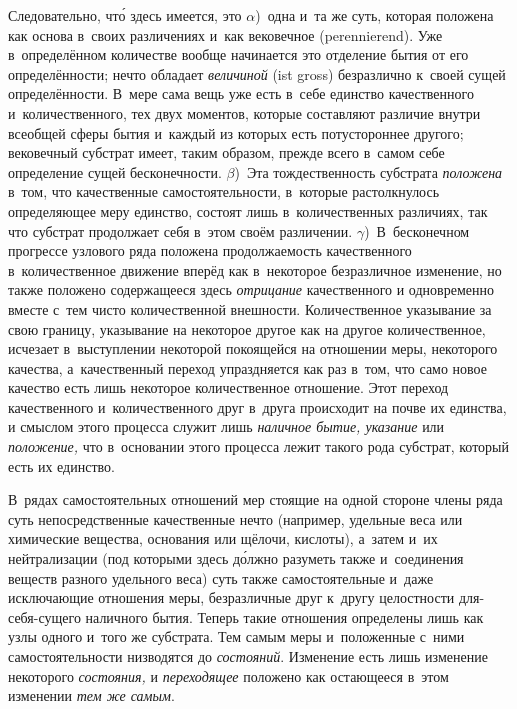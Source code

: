 Следовательно, чт\'{о} здесь имеется, это $\alpha$)~одна и~та же суть,
которая положена как основа в~своих различениях и~как вековечное
(peren\-nie\-rend). Уже в~определённом количестве вообще начинается это
отделение бытия от его определённости; нечто обладает {\em величиной} (ist
gross) безразлично к~своей сущей определённости. В~мере сама вещь уже есть
в~себе единство качественного и~количественного, тех двух моментов, которые
составляют различие внутри всеобщей сферы бытия и~каждый из которых есть
потустороннее другого; вековечный субстрат имеет, таким образом, прежде всего
в~самом себе определение сущей бесконечности. $\beta$)~Эта тождественность
субстрата {\em положена} в~том, что качественные самостоятельности, в~которые
растолкнулось определяющее меру единство, состоят лишь в~количественных
различиях, так что субстрат продолжает себя в~этом своём различении.
$\gamma$)~В~бесконечном прогрессе узлового ряда положена продолжаемость
качественного в~количественное движение вперёд как в~некоторое безразличное
изменение, но также положено содержащееся здесь {\em отрицание} качественного и
одновременно вместе с~тем чисто количественной внешности. Количественное
указывание за свою границу, указывание на некоторое другое как на другое
количественное, исчезает в~выступлении некоторой покоящейся на отношении меры,
некоторого качества, а~качественный переход упраздняется как раз в~том, что
само новое качество есть лишь некоторое количественное отношение. Этот переход
качественного и~количественного друг в~друга происходит на почве их единства, и
смыслом этого процесса служит лишь {\em наличное бытие, указание} или
{\em положение,} что в~основании этого процесса лежит такого рода субстрат,
который есть их единство.

В~рядах самостоятельных отношений мер стоящие на одной стороне члены ряда суть
непосредственные качественные нечто (например, удельные веса или химические
вещества, основания или щёлочи, кислоты), а~затем и~их нейтрализации (под
которыми здесь д\'{о}лжно разуметь также и~соединения веществ разного удельного
веса) суть также самостоятельные и~даже исключающие отношения меры,
безразличные друг к~другу целостности для-себя-сущего наличного бытия. Теперь
такие отношения определены лишь как узлы одного и~того же субстрата. Тем самым
меры и~положенные с~ними самостоятельности низводятся до {\em состояний}.
Изменение есть лишь изменение некоторого {\em состояния,} и {\em переходящее}
положено как остающееся в~этом изменении {\em тем же самым}.

